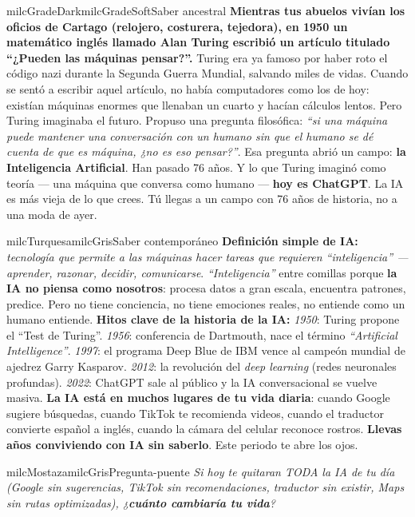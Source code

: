 \documentclass[11pt,letterpaper]{article}
\begin{document}
\begin{softbox}{milcGradeDark}{milcGradeSoft}{Saber ancestral}
\textbf{Mientras tus abuelos vivían los oficios de Cartago (relojero, costurera, tejedora), en 1950 un matemático inglés llamado Alan Turing escribió un artículo titulado ``¿Pueden las máquinas pensar?''.} Turing era ya famoso por haber roto el código nazi durante la Segunda Guerra Mundial, salvando miles de vidas. Cuando se sentó a escribir aquel artículo, no había computadores como los de hoy: existían máquinas enormes que llenaban un cuarto y hacían cálculos lentos. Pero Turing imaginaba el futuro. Propuso una pregunta filosófica: \emph{``si una máquina puede mantener una conversación con un humano sin que el humano se dé cuenta de que es máquina, ¿no es eso pensar?''}. Esa pregunta abrió un campo: \textbf{la Inteligencia Artificial}. Han pasado 76 años. Y lo que Turing imaginó como teoría --- una máquina que conversa como humano --- \textbf{hoy es ChatGPT}. La IA es más vieja de lo que crees. Tú llegas a un campo con 76 años de historia, no a una moda de ayer.
\end{softbox}

\begin{softbox}{milcTurquesa}{milcGris}{Saber contemporáneo}
\textbf{Definición simple de IA:} \emph{tecnología que permite a las máquinas hacer tareas que requieren ``inteligencia'' --- aprender, razonar, decidir, comunicarse}. \emph{``Inteligencia''} entre comillas porque \textbf{la IA no piensa como nosotros}: procesa datos a gran escala, encuentra patrones, predice. Pero no tiene conciencia, no tiene emociones reales, no entiende como un humano entiende. \textbf{Hitos clave de la historia de la IA:} \emph{1950}: Turing propone el ``Test de Turing''. \emph{1956}: conferencia de Dartmouth, nace el término \emph{``Artificial Intelligence''}. \emph{1997}: el programa Deep Blue de IBM vence al campeón mundial de ajedrez Garry Kasparov. \emph{2012}: la revolución del \emph{deep learning} (redes neuronales profundas). \emph{2022}: ChatGPT sale al público y la IA conversacional se vuelve masiva. \textbf{La IA está en muchos lugares de tu vida diaria}: cuando Google sugiere búsquedas, cuando TikTok te recomienda videos, cuando el traductor convierte español a inglés, cuando la cámara del celular reconoce rostros. \textbf{Llevas años conviviendo con IA sin saberlo}. Este periodo te abre los ojos.
\end{softbox}

\begin{softbox}{milcMostaza}{milcGris}{Pregunta-puente}
\textit{Si hoy te quitaran TODA la IA de tu día (Google sin sugerencias, TikTok sin recomendaciones, traductor sin existir, Maps sin rutas optimizadas), ¿\textbf{cuánto cambiaría tu vida}?}
\end{softbox}
\end{document}
